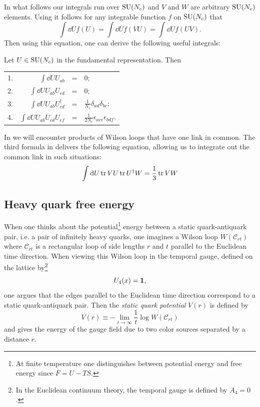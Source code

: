 In what follows our integrals run over $\operatorname{SU}(N_c)$
and $V$ and $W$ are arbitrary $\operatorname{SU}(N_c)$ elements.
Using  it follows for any 
integrable function $f$ on $\operatorname{SU}(N_c)$ that
\begin{equation}
  \int\dd Uf(U)=\int\dd Uf(VU)=\int\dd Uf(UV).
\end{equation}
Then using this equation, one can derive the following
useful integrals:
\begin{proposition}{}{}\label{prp:haar}
  Let $U\in\operatorname{SU}(N_c)$ in the fundamental representation. Then
  \begin{center}\begin{tabular}{lrcl}
  1. &$\int \dd U U_{ab}$ &=& 0;\\[1mm]
  2. &$\int \dd U U_{ab}U_{cd}$ &=& 0;\\[1mm]
  3. &$\int \dd U U_{ab}U^\dagger_{cd}$ 
       &=& $\frac{1}{N_c}\delta_{ad}\delta_{bc}$;\\[1mm]
  4. &$\int \dd U U_{ab}U_{cd}U_{ef}$ 
       &=& $\frac{1}{2 N_c}\epsilon_{ace}\epsilon_{bdf}$.
  \end{tabular}\end{center}
\end{proposition}
In  we will encounter products of Wilson
loops that have one link in common. The third formula in
 delivers the following equation, allowing
us to integrate out the common link in such situations:
\begin{equation}
  \int \dd U\tr VU\tr U^\dagger W=\frac{1}{3}\tr VW
\end{equation}

\subsection{Heavy quark free energy}\label{sec:hqfe}


When one thinks about the potential\footnote{At finite temperature
one distinguishes between potential energy and free energy since $F=U-TS$.}
energy between a static quark-antiquark pair, 
i.e. a pair of infinitely heavy quarks, one imagines
a Wilson loop $W(\mathcal{C}_{rt})$
where $\mathcal{C}_{rt}$ is a rectangular loop of side lengths 
$r$ and $t$ parallel
to the Euclidean time direction. When
viewing this Wilson loop in the temporal gauge, 
defined on the lattice by\footnote{In the Euclidean continuum theory,
the temporal gauge is defined by $A_4=0$.}
\begin{equation}
  U_4(x)={\mathbf 1},
\end{equation}
one argues that
the edges parallel to the Euclidean time direction correspond to
a static quark-antiquark pair.
Then the {\it static quark potential}
 $V(r)$ is defined by
\begin{equation}\label{eq:staticpotential}
  V(r)\equiv-\lim_{t\to\infty}\frac{1}{t}\log W(\mathcal{C}_{rt})  
\end{equation}
and gives the energy of the gauge field due to two color sources separated by
a distance $r$. 



